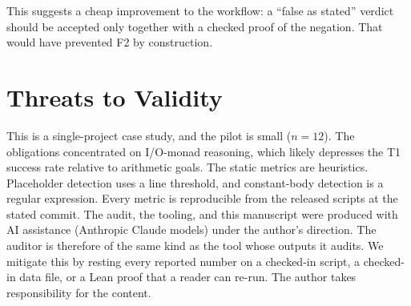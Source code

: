 \documentclass[sigconf,nonacm]{acmart}
\begin{document}
This suggests a cheap improvement to the workflow: a ``false as stated'' verdict should be accepted only together with a checked proof of the negation. That would have prevented F2 by construction.

\section{Threats to Validity}
This is a single-project case study, and the pilot is small ($n=12$). The obligations concentrated on I/O-monad reasoning, which likely depresses the T1 success rate relative to arithmetic goals. The static metrics are heuristics. Placeholder detection uses a line threshold, and constant-body detection is a regular expression. Every metric is reproducible from the released scripts at the stated commit. The audit, the tooling, and this manuscript were produced with AI assistance (Anthropic Claude models) under the author's direction. The auditor is therefore of the same kind as the tool whose outputs it audits. We mitigate this by resting every reported number on a checked-in script, a checked-in data file, or a Lean proof that a reader can re-run. The author takes responsibility for the content.
\end{document}
